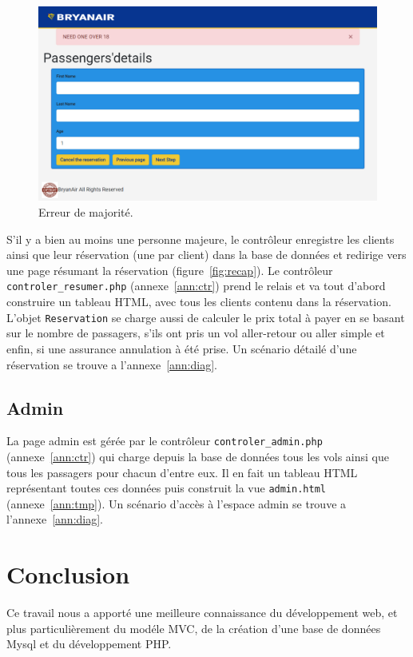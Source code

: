 \documentclass[12pt,a4paper]{article}
\begin{document}
			\begin{figure}[!ht]
        \includegraphics[width=\textwidth]{ageError.png}
				\caption{Erreur de majorité.}
				\label{fig:ageError}
			\end{figure}

			S'il y a bien au moins une personne majeure, le contrôleur enregistre les clients ainsi que leur réservation (une par client) dans la base de données et redirige vers une page résumant la réservation (figure~\ref{fig:recap}). Le contrôleur \texttt{controler\_resumer.php} (annexe~\ref{ann:ctr}) prend le relais et va tout d'abord construire un tableau HTML, avec tous les clients contenu dans la réservation. L'objet \texttt{Reservation} se charge aussi de calculer le prix total à payer en se basant sur le nombre de passagers, s'ils ont pris un vol aller-retour ou aller simple et enfin, si une assurance annulation à été prise. Un scénario détailé d'une réservation se trouve a l'annexe~\ref{ann:diag}.

		\subsection{Admin}
			La page admin est gérée par le contrôleur \texttt{controler\_admin.php} (annexe~\ref{ann:ctr}) qui charge depuis la base de données tous les vols ainsi que tous les passagers pour chacun d'entre eux. Il en fait un tableau HTML représentant toutes ces données puis construit la vue \texttt{admin.html} (annexe~\ref{ann:tmp}). Un scénario d'accès à l'espace admin se trouve a l'annexe~\ref{ann:diag}.

	\section*{Conclusion}
      Ce travail nous a apporté une meilleure connaissance du développement web, et plus particulière\-ment du modéle MVC, de la création d'une base de données Mysql et du développement PHP.
\end{document}
